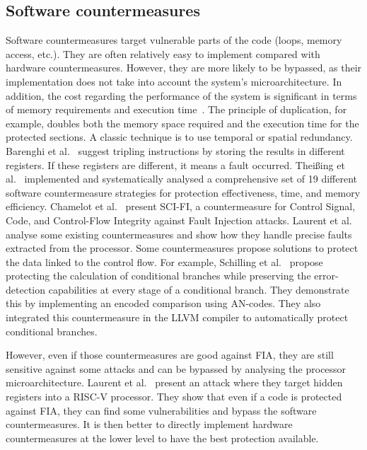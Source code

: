 \subsection{Software countermeasures}
Software countermeasures target vulnerable parts of the code (loops, memory access, etc.). They are often relatively easy to implement compared with hardware countermeasures. However, they are more likely to be bypassed, as their implementation does not take into account the system's microarchitecture.
In addition, the cost regarding the performance of the system is significant in terms of memory requirements and execution time~\cite{BCNTW-06-procieee}. The principle of duplication, for example, doubles both the memory space required and the execution time for the protected sections.
A classic technique is to use temporal or spatial redundancy. Barenghi et al.~\cite{BBKPR-10-wess} suggest tripling instructions by storing the results in different registers. If these registers are different, it means a fault occurred.
Theißing et al.~\cite{TMSSS-13-date} implemented and systematically analysed a comprehensive set of 19 different software countermeasure strategies for protection effectiveness, time, and memory efficiency.
Chamelot et al.~\cite{CCH-22-date} present SCI-FI, a countermeasure for Control Signal, Code, and Control-Flow Integrity against Fault Injection attacks.
Laurent et al.~\cite{LBDPP-19-microproc} analyse some existing countermeasures and show how they handle precise faults extracted from the processor.
Some countermeasures propose solutions to protect the data linked to the control flow. For example, Schilling et al.~\cite{SWM-18-date} propose protecting the calculation of conditional branches while preserving the error-detection capabilities at every stage of a conditional branch. They demonstrate this by implementing an encoded comparison using AN-codes. They also integrated this countermeasure in the LLVM compiler to automatically protect conditional branches.

However, even if those countermeasures are good against FIA, they are still sensitive against some attacks and can be bypassed by analysing the processor microarchitecture. Laurent et al.~\cite{LBDP-19-date} present an attack where they target hidden registers into a \mbox{RISC-V} processor. They show that even if a code is protected against FIA, they can find some vulnerabilities and bypass the software countermeasures. It is then better to directly implement hardware countermeasures at the lower level to have the best protection available.

